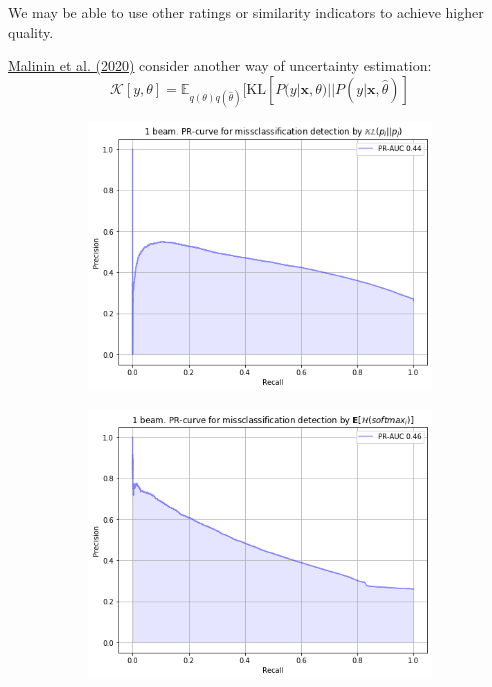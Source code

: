 \documentclass[a4paper,14pt]{extarticle}
\newcommand{\bibref}[3]{\hyperlink{#1}{#2 (#3)}}
\begin{document}
	We may be able to use other ratings or similarity indicators to achieve higher quality.
	
	\bibref{uncertainty}{Malinin et al.} {2020} consider another way of uncertainty estimation:
	\begin{equation*}
		\mathcal{K}[y, \theta] = \mathbb{E}_{q(\theta)q(\hat{\theta})}[
			\mathrm{KL}[P(y|\textbf{x}, \theta) || P(y|\textbf{x}, \hat{\theta})
		]
	\end{equation*}
	
	\begin{figure}[t]
		\begin{subfigure}{.45\textwidth}
			\includegraphics[width=\textwidth]{images/malinin_in_kl.png}
		\end{subfigure}
		\begin{subfigure}{.45\textwidth}
			\includegraphics[width=\textwidth]{images/malinin_in_du.png}
		\end{subfigure}
	\end{figure}
\end{document}
